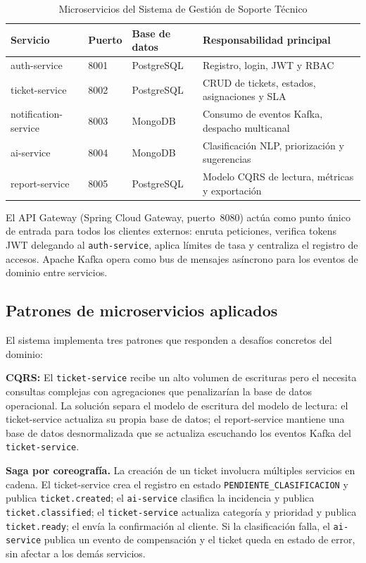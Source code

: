 \documentclass[12pt, a4paper]{article}
\begin{document}
\begin{table}[H]
\centering
\caption{Microservicios del Sistema de Gestión de Soporte Técnico}
\label{tab:microservicios}
\begin{tabular}{>{\ttfamily}p{4.5cm} p{1.5cm} p{3.25cm} p{5.5cm}}
\toprule
\textbf{Servicio} & \textbf{Puerto} & \textbf{Base de datos} & \textbf{Responsabilidad principal} \\
\midrule
auth-service         & 8001 & PostgreSQL & Registro, login, JWT y RBAC \\
ticket-service       & 8002 & PostgreSQL & CRUD de tickets, estados, asignaciones y SLA \\
notification-service & 8003 & MongoDB    & Consumo de eventos Kafka, despacho multicanal \\
ai-service           & 8004 & MongoDB    & Clasificación NLP, priorización y sugerencias \\
report-service       & 8005 & PostgreSQL & Modelo CQRS de lectura, métricas y exportación \\
\bottomrule
\end{tabular}
\end{table}

El API Gateway (Spring Cloud Gateway, puerto~8080) actúa como punto único de
entrada para todos los clientes externos: enruta peticiones, verifica tokens JWT
delegando al \texttt{auth-service}, aplica límites de tasa y centraliza el
registro de accesos. Apache Kafka opera como bus de mensajes asíncrono para los
eventos de dominio entre servicios.

\subsection{Patrones de microservicios aplicados}

El sistema implementa tres patrones que responden a desafíos concretos del dominio:

\textbf{CQRS:} El \texttt{ticket-service} recibe un alto volumen de escrituras
pero el  necesita consultas complejas con agregaciones que
penalizarían la base de datos operacional. La solución separa el modelo de escritura
del modelo de lectura: el ticket-service actualiza su propia base de datos;
el report-service mantiene una base de datos desnormalizada que se actualiza
escuchando los eventos Kafka del \texttt{ticket-service}.

\textbf{Saga por coreografía.} La creación de un ticket involucra múltiples
servicios en cadena. El ticket-service crea el registro en estado
\texttt{PENDIENTE\_CLASIFICACION} y publica \texttt{ticket.created}; el
\texttt{ai-service} clasifica la incidencia y publica \texttt{ticket.classified};
el \texttt{ticket-service} actualiza categoría y prioridad y publica
\texttt{ticket.ready}; el  envía la confirmación al
cliente. Si la clasificación falla, el \texttt{ai-service} publica un evento de
compensación y el ticket queda en estado de error, sin afectar a los demás
servicios. 
\end{document}

